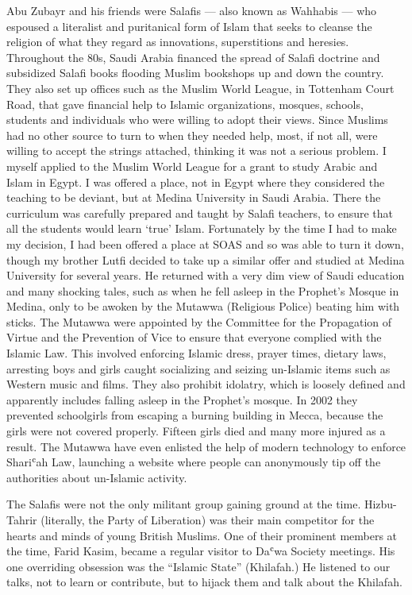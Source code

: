 \documentclass[12pt]{memoir}
\def\`{ʿ} %
\newcommand{\cor}[2]{#2} %
\def\–{-\hskip0pt}
\begin{document}
Abu Zubayr and his friends were Salafis — also known as Wahhabis —
who espoused a literalist and puritanical form of Islam
that seeks to cleanse the religion of what they regard
as innovations, superstitions and heresies.
Throughout the 80s, Saudi Arabia financed the spread of Salafi doctrine
and subsidized Salafi books
\cor{flooded}{flooding} Muslim bookshops up and down the country.
They also set up offices such as the Muslim World League,
in Tottenham Court Road, that gave financial help to Islamic organizations,
mosques, schools, students and individuals
who were willing to adopt their views.
Since Muslims had no other source to turn to when they needed help, most,
if not all, were willing to accept the strings attached,
thinking it was not a serious problem.
I myself applied to the Muslim World League
for a grant to study Arabic and Islam in Egypt.
I was offered a place,
not in Egypt where they considered the teaching to be deviant,
but at Medina University in Saudi Arabia.
There the curriculum was carefully prepared and taught by Salafi teachers,
to ensure that all the students would learn ‘true’ Islam.
Fortunately by the time I had to make my decision,
I had been offered a place at SOAS and so was able to turn it down,
though my brother Lutfi decided to take up a similar offer
and studied at Medina University for several years.
He returned with a very dim view of Saudi education and many shocking tales,
such as when he fell asleep in the Prophet’s Mosque in Medina,
only to be awoken by the Mutawwa (Religious Police) beating him with sticks.
The Mutawwa were appointed by the Committee for the Propagation of Virtue
and the Prevention of Vice to ensure
that everyone complied with the Islamic Law.
This involved enforcing Islamic dress, prayer times, dietary laws,
arresting boys and girls caught socializing
and seizing un-Islamic items such as Western music and films.
They also prohibit idolatry,
which is loosely defined and apparently includes falling asleep
in the Prophet’s mosque.
In 2002 they prevented schoolgirls from escaping a burning building in Mecca,
because the girls were not covered properly.
Fifteen girls died and many more injured as a result.
The Mutawwa have even enlisted the help of modern technology
to enforce Shari\`ah Law, launching a website where people can anonymously
tip off the authorities about un\–Islamic activity.

The Salafis were not the only militant group gaining ground at the time.
Hizbu\–Tahrir (literally, the Party of Liberation)
was their main competitor for the hearts and minds of young British Muslims.
One of their prominent members at the time, Farid Kasim,
became a regular visitor to Da\`wa Society meetings.
His one overriding obsession was the “Islamic State” (Khilafah.)
He listened to our talks, not to learn or contribute,
but to hijack them and talk about the Khilafah.
\end{document}
